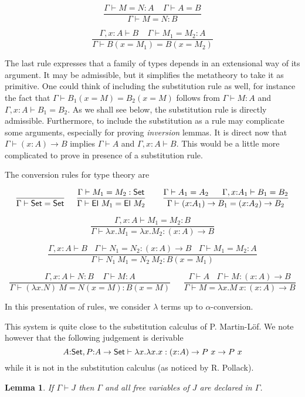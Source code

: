 \documentclass[11pt]{article}
\newtheorem{lemma}[theorem]{Lemma}
\def\SET{\hbox{\sf Set}}
\def\EL{\hbox{\sf El}}
\begin{document}
$$
\frac{\Gamma\vdash M=N:A~~~~~\Gamma\vdash A = B}
     {\Gamma\vdash M=N:B}
$$

$$
\frac{\Gamma,x{:}A\vdash B~~~~~\Gamma\vdash M_1=M_2:A}
     {\Gamma\vdash B(x=M_1) = B(x=M_2)}
$$

\medskip

 The last rule expresses
that a family of types depends in an extensional way of its argument. 
It may be admissible, but it simplifies the metatheory to take
it as primitive. One could think
of including the substitution rule as well, for instance
the fact that $\Gamma\vdash B_1(x=M)=B_2(x=M)$
follows from $\Gamma\vdash M:A$ and $\Gamma,x{:}A\vdash B_1=B_2$.
As we shall see
below, the substitution rule is directly admissible. Furthermore, to include the substitution as a
rule may complicate some arguments, especially for proving {\em inversion} lemmas. It is
direct now that $\Gamma\vdash (x{:}A)\rightarrow B$ implies $\Gamma\vdash A$ and
$\Gamma,x{:}A\vdash B$. This would be a little more complicated to prove in presence of
a substitution rule.

 The conversion rules for type theory are

$$
\frac{}{\Gamma\vdash\SET=\SET}~~~~
\frac{\Gamma\vdash M_1=M_2:\SET}{\Gamma\vdash\EL~M_1=\EL~M_2}~~~~~~
\frac{\Gamma\vdash A_1=A_2~~~~~\Gamma,x{:}A_1\vdash B_1=B_2}{\Gamma\vdash (x{:}A_1)\rightarrow B_1 = (x{:}A_2)\rightarrow B_2}
$$

$$
\frac{\Gamma,x{:}A\vdash M_1=M_2:B}{\Gamma\vdash \lambda x.M_1=\lambda x.M_2:(x{:}A)\rightarrow B}
$$

$$
\frac{\Gamma,x{:}A\vdash B~~~~\Gamma\vdash N_1=N_2:(x{:}A)\rightarrow B~~~~\Gamma\vdash M_1=M_2:A}
     {\Gamma\vdash N_1~M_1 = N_2~M_2:B(x=M_1)}
$$

$$
\frac{\Gamma,x{:}A\vdash N:B~~~~~\Gamma\vdash M:A}
     {\Gamma\vdash (\lambda x.N)~M = N(x=M): B(x=M)}~~~~~~~
\frac{\Gamma\vdash A~~~~\Gamma\vdash M:(x{:}A)\rightarrow B}
     {\Gamma\vdash M = \lambda x.M~x : (x{:}A)\rightarrow B}
$$

 In this presentation of rules, we consider $\lambda$ terms up to  $\alpha$-conversion.

 This system is quite close to the substitution calculus of P. Martin-L\"of. We note
however that the following judgement is derivable
$$
A{:}\SET,P{:}A\rightarrow\SET\vdash \lambda x.\lambda x.x:(x{:}A)\rightarrow P~x\rightarrow P~x
$$
while it is not in the substitution calculus (as noticed by R. Pollack).


\begin{lemma}
If $\Gamma\vdash J$ then $\Gamma$ and all free variables of $J$ are declared in $\Gamma$.
\end{lemma}
\end{document}
